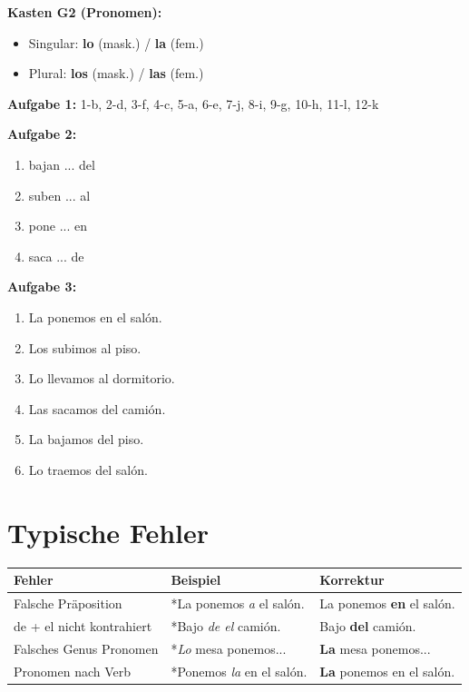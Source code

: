 \documentclass[11pt, a4paper]{article}
\begin{document}
\textbf{Kasten G2 (Pronomen):}
\begin{itemize}[leftmargin=1.5em, itemsep=0pt]
    \item Singular: \textbf{lo} (mask.) / \textbf{la} (fem.)
    \item Plural: \textbf{los} (mask.) / \textbf{las} (fem.)
\end{itemize}

\textbf{Aufgabe 1:} 1-b, 2-d, 3-f, 4-c, 5-a, 6-e, 7-j, 8-i, 9-g, 10-h, 11-l, 12-k

\textbf{Aufgabe 2:}
\begin{enumerate}[label=\alph*), leftmargin=1.5em, itemsep=0pt]
    \item bajan ... del
    \item suben ... al
    \item pone ... en
    \item saca ... de
\end{enumerate}

\textbf{Aufgabe 3:}
\begin{enumerate}[label=\alph*), leftmargin=1.5em, itemsep=0pt]
    \item La ponemos en el salón.
    \item Los subimos al piso.
    \item Lo llevamos al dormitorio.
    \item Las sacamos del camión.
    \item La bajamos del piso.
    \item Lo traemos del salón.
\end{enumerate}


\section*{Typische Fehler}

\begin{tabularx}{\textwidth}{@{}lXX@{}}
\textbf{Fehler} & \textbf{Beispiel} & \textbf{Korrektur} \\
\midrule
Falsche Präposition & *La ponemos \textit{a} el salón. & La ponemos \textbf{en} el salón. \\
de + el nicht kontrahiert & *Bajo \textit{de el} camión. & Bajo \textbf{del} camión. \\
Falsches Genus Pronomen & *\textit{Lo} mesa ponemos... & \textbf{La} mesa ponemos... \\
Pronomen nach Verb & *Ponemos \textit{la} en el salón. & \textbf{La} ponemos en el salón. \\
\bottomrule
\end{tabularx}
\end{document}
